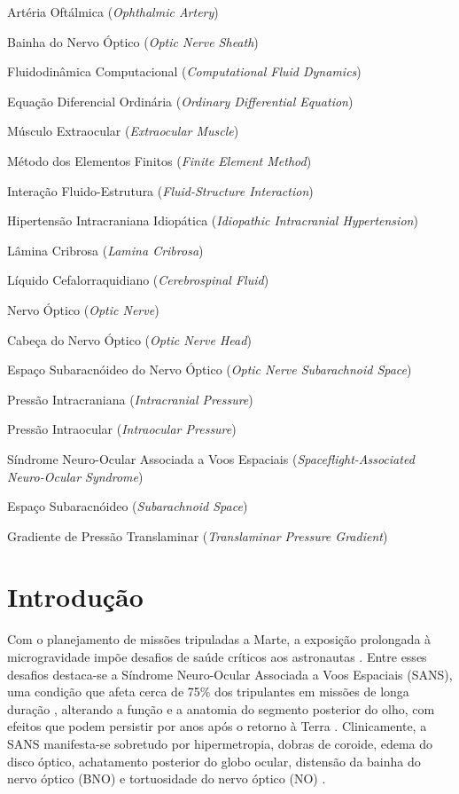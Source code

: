 \documentclass[article, hidelinks,oneside,12pt]{abntex2}
\begin{document}
\newpage

\begin{siglas}
  \item[AO] Artéria Oftálmica (\textit{Ophthalmic Artery})
  \item[BNO] Bainha do Nervo Óptico (\textit{Optic Nerve Sheath})
  \item[CFD] Fluidodinâmica Computacional (\textit{Computational Fluid Dynamics})
  \item[EDO] Equação Diferencial Ordinária (\textit{Ordinary Differential Equation})
  \item[EOM] Músculo Extraocular (\textit{Extraocular Muscle})
  \item[FEM] Método dos Elementos Finitos (\textit{Finite Element Method})
  \item[FSI] Interação Fluido-Estrutura (\textit{Fluid-Structure Interaction})
  \item[HII] Hipertensão Intracraniana Idiopática (\textit{Idiopathic Intracranial Hypertension})
  \item[LC] Lâmina Cribrosa (\textit{Lamina Cribrosa})
  \item[LCR] Líquido Cefalorraquidiano (\textit{Cerebrospinal Fluid})
  \item[NO] Nervo Óptico (\textit{Optic Nerve})
  \item[ONH] Cabeça do Nervo Óptico (\textit{Optic Nerve Head})
  \item[ONSAS] Espaço Subaracnóideo do Nervo Óptico (\textit{Optic Nerve Subarachnoid Space})
  \item[PIC] Pressão Intracraniana (\textit{Intracranial Pressure})
  \item[PIO] Pressão Intraocular (\textit{Intraocular Pressure})
  \item[SANS] Síndrome Neuro-Ocular Associada a Voos Espaciais (\textit{Spaceflight-Associated Neuro-Ocular Syndrome})
  \item[SAS] Espaço Subaracnóideo (\textit{Subarachnoid Space})
  \item[TLPG] Gradiente de Pressão Translaminar (\textit{Translaminar Pressure Gradient})
\end{siglas}



\section*{Introdução}

Com o planejamento de missões tripuladas a Marte, a exposição prolongada à microgravidade impõe desafios de saúde críticos aos astronautas \cite{nasa}. Entre esses desafios destaca-se a Síndrome Neuro-Ocular Associada a Voos Espaciais (SANS), uma condição que afeta cerca de 75\% dos tripulantes em missões de longa duração \cite{lee2018}, alterando a função e a anatomia do segmento posterior do olho, com efeitos que podem persistir por anos após o retorno à Terra \cite{nasa}. Clinicamente, a SANS manifesta-se sobretudo por hipermetropia, dobras de coroide, edema do disco óptico, achatamento posterior do globo ocular, distensão da bainha do nervo óptico (BNO) e tortuosidade do nervo óptico (NO) \cite{mader2011, zhang2018, lee2020}. 
\end{document}
